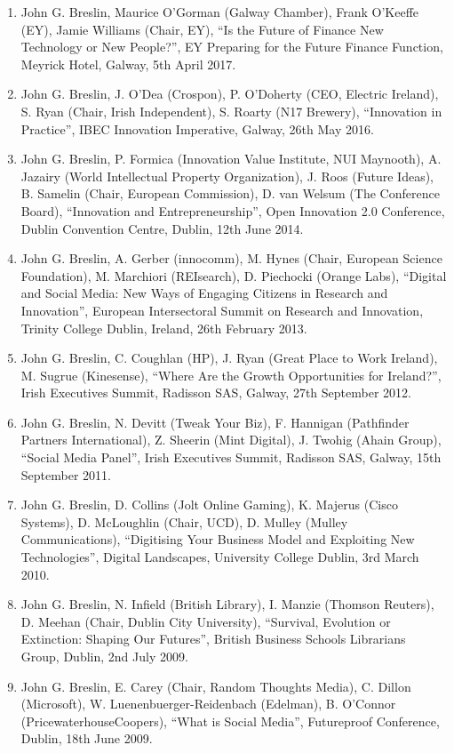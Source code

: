 \documentclass[10pt,a4paper]{res} %
\begin{document}
\begin{resume}
\begin{enumerate}
\item John G. Breslin, Maurice O'Gorman (Galway Chamber), Frank O'Keeffe (EY), Jamie Williams (Chair, EY), ``Is the Future of Finance New Technology or New People?'', EY Preparing for the Future Finance Function, Meyrick Hotel, Galway, 5th April 2017.
\item John G. Breslin, J. O'Dea (Crospon), P. O'Doherty (CEO, Electric Ireland), S. Ryan (Chair, Irish Independent), S. Roarty (N17 Brewery), ``Innovation in Practice'', IBEC Innovation Imperative, Galway, 26th May 2016.
\item John G. Breslin, P. Formica (Innovation Value Institute, NUI Maynooth), A. Jazairy (World Intellectual Property Organization), J. Roos (Future Ideas), B. Samelin (Chair, European Commission), D. van Welsum (The Conference Board), ``Innovation and Entrepreneurship'', Open Innovation 2.0 Conference, Dublin Convention Centre, Dublin, 12th June 2014.
\item John G. Breslin, A. Gerber (innocomm), M. Hynes (Chair, European Science Foundation), M. Marchiori (REIsearch), D. Piechocki (Orange Labs), ``Digital and Social Media: New Ways of Engaging Citizens in Research and Innovation'', European Intersectoral Summit on Research and Innovation, Trinity College Dublin, Ireland, 26th February 2013.
\item John G. Breslin, C. Coughlan (HP), J. Ryan (Great Place to Work Ireland), M. Sugrue (Kinesense), ``Where Are the Growth Opportunities for Ireland?'', Irish Executives Summit, Radisson SAS, Galway, 27th September 2012.
\item John G. Breslin, N. Devitt (Tweak Your Biz), F. Hannigan (Pathfinder Partners International), Z. Sheerin (Mint Digital), J. Twohig (Ahain Group), ``Social Media Panel'', Irish Executives Summit, Radisson SAS, Galway, 15th September 2011.
\item John G. Breslin, D. Collins (Jolt Online Gaming), K. Majerus (Cisco Systems), D. McLoughlin (Chair, UCD), D. Mulley (Mulley Communications), ``Digitising Your Business Model and Exploiting New Technologies'', Digital Landscapes, University College Dublin, 3rd March 2010.
\item John G. Breslin, N. Infield (British Library), I. Manzie (Thomson Reuters), D. Meehan (Chair, Dublin City University), ``Survival, Evolution or Extinction: Shaping Our Futures'', British Business Schools Librarians Group, Dublin, 2nd July 2009.
\item John G. Breslin, E. Carey (Chair, Random Thoughts Media), C. Dillon (Microsoft), W. Luenenbuerger-Reidenbach (Edelman), B. O'Connor (PricewaterhouseCoopers), ``What is Social Media'', Futureproof Conference, Dublin, 18th June 2009.

\end{enumerate}
\end{resume}
\end{document}
